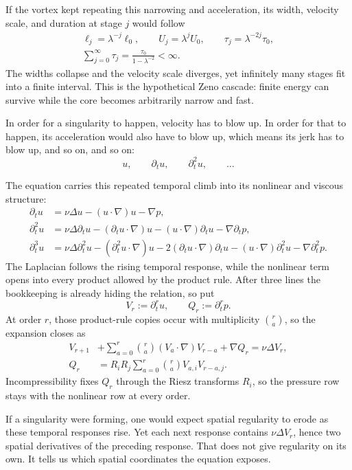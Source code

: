If the vortex kept repeating this narrowing and acceleration, its width,
velocity scale, and duration at stage \(j\) would follow
\[
\begin{gathered}
 \ell_j=\lambda^{-j}\ell_0,
 \qquad
 U_j=\lambda^jU_0,
 \qquad
 \tau_j=\lambda^{-2j}\tau_0,
 \\
 \sum_{j=0}^{\infty}\tau_j
 =\frac{\tau_0}{1-\lambda^{-2}}<\infty.
\end{gathered}
\]
The widths collapse and the velocity scale diverges, yet infinitely many
stages fit into a finite interval.  This is the hypothetical Zeno cascade:
finite energy can survive while the core becomes arbitrarily narrow and fast.

In order for a singularity to happen, velocity
has to blow up.  In order for that to happen, its acceleration would also have
to blow up, which means its jerk has to blow up, and so on, and so on:
\[
 u,\qquad \partial_tu,\qquad \partial_t^2u,\qquad\ldots
\]

The equation carries this repeated temporal climb into its nonlinear and
viscous structure:
\[
\begin{aligned}
 \partial_tu
 &=\nu\Delta u-(u\!\cdot\nabla)u-\nabla p,\\
 \partial_t^2u
 &=\nu\Delta\partial_tu
   -(\partial_tu\!\cdot\nabla)u
   -(u\!\cdot\nabla)\partial_tu
   -\nabla\partial_tp,\\
 \partial_t^3u
 &=\nu\Delta\partial_t^2u
   -(\partial_t^2u\!\cdot\nabla)u
   -2(\partial_tu\!\cdot\nabla)\partial_tu
   -(u\!\cdot\nabla)\partial_t^2u
   -\nabla\partial_t^2p.
\end{aligned}
\]
The Laplacian follows the rising temporal response, while the nonlinear term
opens into every product allowed by the product rule.  After three lines the
bookkeeping is already hiding the relation, so put
\[
 V_r:=\partial_t^ru,
 \qquad
 Q_r:=\partial_t^rp.
\]
At order \(r\), those product-rule copies occur with multiplicity
\(\binom ra\), so the expansion closes as
\[
\begin{aligned}
 V_{r+1}
 &+\sum_{a=0}^{r}\binom ra
   (V_a\!\cdot\nabla)V_{r-a}
   +\nabla Q_r
   =\nu\Delta V_r,\\
 Q_r
 &=R_iR_j\sum_{a=0}^{r}\binom ra
   V_{a,i}V_{r-a,j}.
\end{aligned}
\]
Incompressibility fixes \(Q_r\) through the Riesz transforms \(R_i\), so the
pressure row stays with the nonlinear row at every order.

If a singularity were forming, one would expect spatial regularity to erode as
these temporal responses rise.  Yet each next response contains
\(\nu\Delta V_r\), hence two spatial derivatives of the preceding response.
That does not give regularity on its own.  It tells us which spatial
coordinates the equation exposes.

